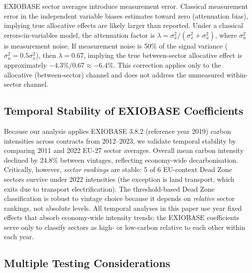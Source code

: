\documentclass[11pt]{article}
\begin{document}
EXIOBASE sector averages introduce measurement error. Classical measurement error in the independent variable biases estimates toward zero (attenuation bias), implying true allocative effects are likely larger than reported. Under a classical errors-in-variables model, the attenuation factor is $\lambda = \sigma^2_x / (\sigma^2_x + \sigma^2_u)$, where $\sigma^2_u$ is measurement noise. If measurement noise is 50\% of the signal variance ($\sigma^2_u = 0.5 \sigma^2_x$), then $\lambda = 0.67$, implying the true between-sector allocative effect is approximately $-4.3\% / 0.67 \approx -6.4\%$. This correction applies only to the allocative (between-sector) channel and does not address the unmeasured within-sector channel.

\subsection{Temporal Stability of EXIOBASE Coefficients}
\label{sec:vintage}

Because our analysis applies EXIOBASE 3.8.2 (reference year 2019) carbon intensities across contracts from 2012--2023, we validate temporal stability by comparing 2011 and 2022 EU-27 sector averages. Overall mean carbon intensity declined by 24.8\% between vintages, reflecting economy-wide decarbonisation. Critically, however, \textit{sector rankings} are stable: 5 of 6 EU-context Dead Zone sectors survive under 2022 intensities (the exception is land transport, which exits due to transport electrification). The threshold-based Dead Zone classification is robust to vintage choice because it depends on \textit{relative} sector rankings, not absolute levels. All temporal analyses in this paper use year fixed effects that absorb economy-wide intensity trends; the EXIOBASE coefficients serve only to classify sectors as high- or low-carbon relative to each other within each year.

\subsection{Multiple Testing Considerations}
\end{document}
